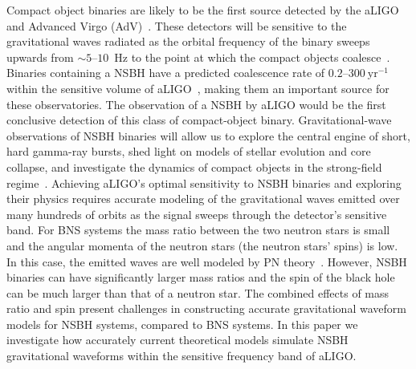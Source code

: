 Compact object binaries are likely to be the first source detected by the
\ac{aLIGO}~\cite{Harry:2010zz} and Advanced Virgo (AdV)~\cite{aVirgo}. These detectors will be sensitive to the
gravitational waves radiated as the orbital frequency of the binary sweeps
upwards from $\sim 5$--$10$~Hz to the point at which the compact objects
coalesce~\cite{Th300}. %
Binaries containing a \ac{NSBH} have a predicted 
coalescence rate of $0.2$--$300\ \textrm{yr}^{-1}$ within the sensitive volume
of aLIGO~\cite{Abadie:2010cf}, making them an important source for these
observatories. The observation of a \ac{NSBH} by \ac{aLIGO} would be the first 
conclusive detection of this class of compact-object binary.
Gravitational-wave observations of \ac{NSBH} binaries will allow us to explore the central engine of short,
hard gamma-ray bursts, shed light on models of stellar evolution and core
collapse, and investigate the dynamics of compact objects in the strong-field regime~\cite{lrr-2009-2, Eichler:1989ve, Narayan:1992iy, Paczynski:1991aq, Berger:2010qx, Fryer:2011cx, Hannam:2013uu}.
Achieving aLIGO's optimal sensitivity to
\ac{NSBH} binaries and exploring their physics 
requires accurate modeling of the gravitational waves emitted 
over many hundreds of orbits as the signal sweeps through the detector's
sensitive band. For \ac{BNS} systems the mass
ratio between the two neutron stars is small and the angular momenta of the
neutron stars (the neutron stars' spins) is low. In this case, the emitted waves are
well modeled by \ac{PN}
theory~\cite{Blanchet:2006zz,Buonanno:2009zt,Brown:2012qf}. 
However, \ac{NSBH} binaries can have significantly larger mass ratios and the spin of
the black hole can be much larger than that of a neutron star. The combined
effects of mass ratio and spin present challenges in constructing accurate gravitational waveform models for
\ac{NSBH} systems, compared to \ac{BNS} systems.  In this paper we
investigate how accurately current theoretical models simulate \ac{NSBH} gravitational waveforms
within the sensitive frequency band of \ac{aLIGO}.

